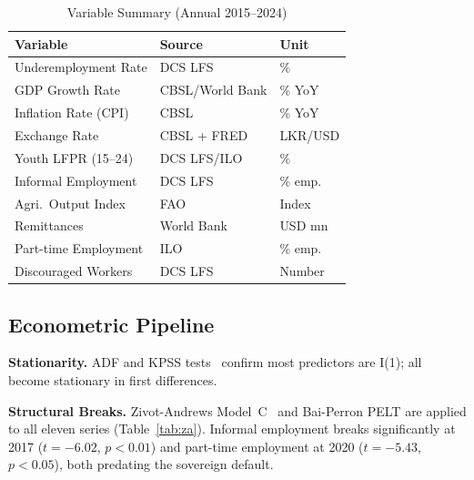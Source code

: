 \documentclass[conference]{IEEEtran}
\begin{document}
\begin{table}[htbp]
\caption{Variable Summary (Annual 2015--2024)}
\label{tab:variables}
\centering
\setlength{\tabcolsep}{3.5pt}
\footnotesize
\begin{tabular}{@{}lll@{}}
\toprule
\textbf{Variable} & \textbf{Source} & \textbf{Unit}\\
\midrule
Underemployment Rate    & DCS LFS         & \%       \\
GDP Growth Rate         & CBSL/World Bank & \% YoY   \\
Inflation Rate (CPI)    & CBSL            & \% YoY   \\
Exchange Rate           & CBSL + FRED     & LKR/USD  \\
Youth LFPR (15--24)     & DCS LFS/ILO     & \%       \\
Informal Employment     & DCS LFS         & \% emp.  \\
Agri.\ Output Index     & FAO             & Index    \\
Remittances             & World Bank      & USD mn   \\
Part-time Employment    & ILO             & \% emp.  \\
Discouraged Workers     & DCS LFS         & Number   \\
\bottomrule
\end{tabular}
\end{table}

\subsection{Econometric Pipeline}

\textbf{Stationarity.} ADF and KPSS tests~\cite{kpss1992} confirm most
predictors are I(1); all become stationary in first differences.

\textbf{Structural Breaks.} Zivot-Andrews Model~C~\cite{zivot1992} and
Bai-Perron PELT are applied to all eleven series (Table~\ref{tab:za}).
Informal employment breaks significantly at 2017 ($t{=}{-6.02}$,
$p{<}0.01$) and part-time employment at 2020 ($t{=}{-5.43}$, $p{<}0.05$),
both predating the sovereign default.
\end{document}
